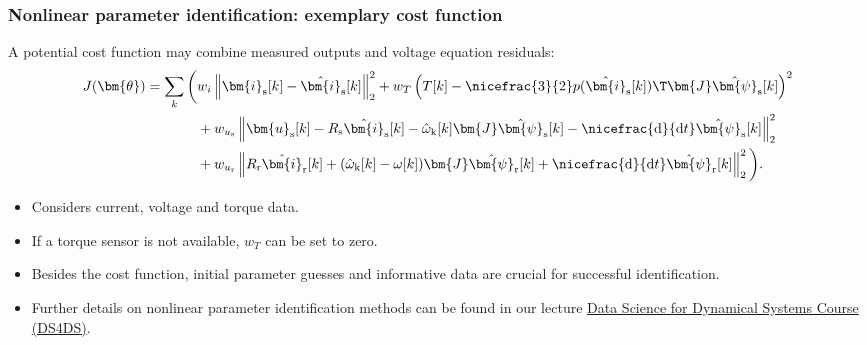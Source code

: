\begin{frame}
    \frametitle{Nonlinear parameter identification: exemplary cost function}
    A potential cost function may combine measured outputs and voltage equation residuals:
    \begin{equation}
        \begin{aligned}
            J(\bm{\theta})=\sum_k \bigg( &
            w_i\left\|\bm{i}_{\mathrm{s}}[k]-\hat{\bm{i}}_{\mathrm{s}}[k]\right\|_2^2
            +w_T\left(T[k]-\nicefrac{3}{2}p(\hat{\bm{i}}_{\mathrm{s}}[k])\T\bm{J}\hat{\bm{\psi}}_{\mathrm{s}}[k]\right)^2                                                                                                                                                          \\
                                         & +w_{u_\mathrm{s}}\left\|\bm{u}_{\mathrm{s}}[k]-R_\mathrm{s}\hat{\bm{i}}_{\mathrm{s}}[k]-\hat{\omega}_{\mathrm{k}}[k]\bm{J}\hat{\bm{\psi}}_{\mathrm{s}}[k]-\nicefrac{\mathrm{d}}{\mathrm{d}t}\hat{\bm{\psi}}_{\mathrm{s}}[k]\right\|_2^2 \\
                                         & +w_{u_\mathrm{r}}\left\|R_\mathrm{r}\hat{\bm{i}}_{\mathrm{r}}[k]+(\hat{\omega}_{\mathrm{k}}[k]-\omega[k])\bm{J}\hat{\bm{\psi}}_{\mathrm{r}}[k]+\nicefrac{\mathrm{d}}{\mathrm{d}t}\hat{\bm{\psi}}_{\mathrm{r}}[k]\right\|_2^2\bigg).
        \end{aligned}
        \label{eq:IM_parameter_identification_example}
    \end{equation}\pause%
    \begin{itemize}
        \item Considers current, voltage and torque data.\pause%
        \item If a torque sensor is not available, $w_T$ can be set to zero.\pause%
        \item Besides the cost function, initial parameter guesses and informative data are crucial for successful identification.\pause%
        \item Further details on nonlinear parameter identification methods can be found in our lecture \href{https://github.com/DS-4-DS/DS4DS_Course}{Data Science for Dynamical Systems Course (DS4DS)}.
    \end{itemize}
\end{frame}



